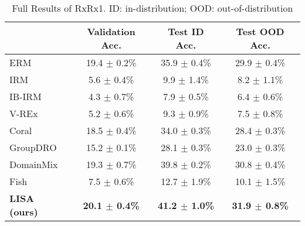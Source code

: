 \begin{table*}[h]
\small
\caption{Full Results of RxRx1. ID: in-distribution; OOD: out-of-distribution}
\label{tab:rr1_full}
\begin{center}
\begin{tabular}{l|ccc}
\toprule
 & Validation Acc. & Test ID Acc. & Test OOD Acc.\\\midrule
ERM & 19.4 $\pm$ 0.2\% & 35.9 $\pm$ 0.4\% & 29.9 $\pm$ 0.4\% \\
IRM  & 5.6 $\pm$ 0.4\% & 9.9 $\pm$ 1.4\% & 8.2 $\pm$ 1.1\% \\
IB-IRM & 4.3 $\pm$ 0.7\% & 7.9 $\pm$ 0.5\% & 6.4 $\pm$ 0.6\% \\
V-REx  & 5.2 $\pm$ 0.6\% & 9.3 $\pm$ 0.9\% & 7.5 $\pm$ 0.8\%\\
Coral & 18.5 $\pm$ 0.4\% & 34.0 $\pm$ 0.3\% & 28.4 $\pm$ 0.3\% \\
GroupDRO & 15.2 $\pm$ 0.1\% & 28.1 $\pm$ 0.3\% & 23.0 $\pm$ 0.3\% \\
DomainMix & 19.3 $\pm$ 0.7\% & 39.8 $\pm$ 0.2\% & 30.8 $\pm$ 0.4\% \\
Fish & 7.5 $\pm$ 0.6\% & 12.7 $\pm$ 1.9\% & 10.1 $\pm$ 1.5\% \\
\midrule
\textbf{LISA (ours)} & \textbf{20.1 $\pm$ 0.4\%} & \textbf{41.2 $\pm$ 1.0\%} & \textbf{31.9 $\pm$ 0.8\%}  \\
\bottomrule
\end{tabular}
\end{center}
\end{table*}


